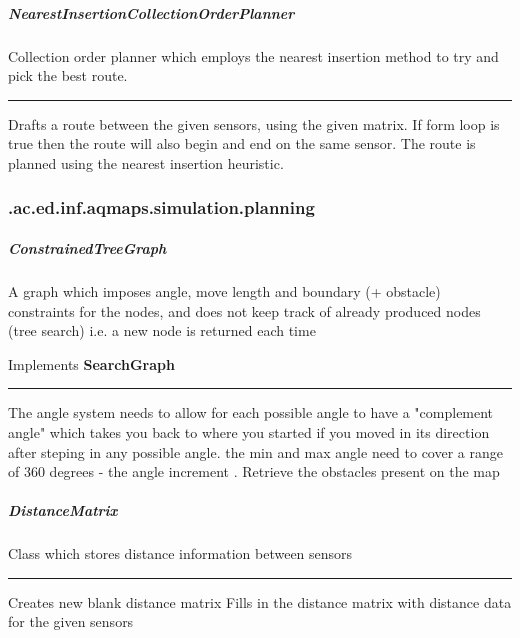 \subparagraph{ NearestInsertionCollectionOrderPlanner } Collection order planner which employs the nearest insertion method to try and pick the best route.
 
\hrule
\begin{mitem}
\scriptsize
	{}
	{Drafts a route between the given sensors, using the given matrix. If form loop is true then the route will also begin and end on the same sensor. The route is planned using the nearest insertion heuristic.}
\end{mitem}

\subsubsection{ .ac.ed.inf.aqmaps.simulation.planning }
\subparagraph{ ConstrainedTreeGraph } A graph which imposes angle, move length and boundary (+ obstacle) constraints for the nodes, and does not keep track of already produced nodes (tree search) i.e. a new node is returned each time
 
Implements \textbf{ SearchGraph }
\hrule
\begin{mitem}
\scriptsize
	{The angle system needs to allow for each possible angle to have a "complement angle" which takes\newline%
 you back to where you started if you moved in its direction after steping in any possible angle.\newline%
 the min and max angle need to cover a range of 360 degrees {-} the angle increment .}
	{Retrieve the obstacles present on the map}
\end{mitem}

\subparagraph{ DistanceMatrix } Class which stores distance information between sensors
 
\hrule
\begin{mitem}
\scriptsize
	{Creates new blank distance matrix}
	{Fills in the distance matrix with distance data for the given sensors}
\end{mitem}

